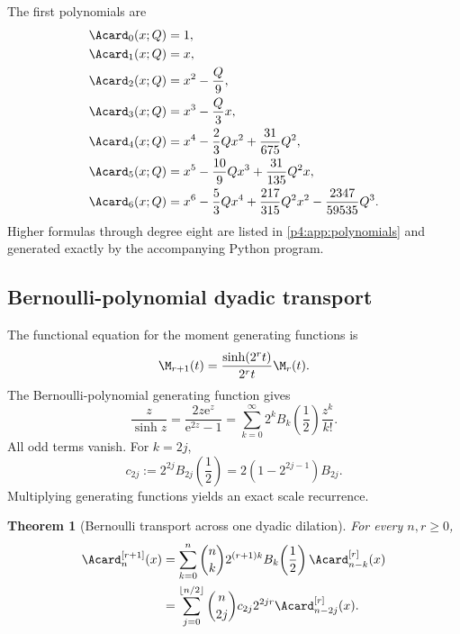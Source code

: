 \documentclass[11pt]{article}
\numberwithin{equation}{section}
\newtheorem{theorem}{Theorem}[section]
\theoremstyle{definition}
\theoremstyle{remark}
\newcommand{\e}{\mathrm e}
\begin{document}
The first polynomials are
\begin{align}
 \Acard_0(x;Q)&=1,\\
 \Acard_1(x;Q)&=x,\\
 \Acard_2(x;Q)&=x^2-\frac Q9,\\
 \Acard_3(x;Q)&=x^3-\frac Q3x,\\
 \Acard_4(x;Q)&=x^4-\frac23Qx^2+\frac{31}{675}Q^2,\\
 \Acard_5(x;Q)&=x^5-\frac{10}{9}Qx^3+\frac{31}{135}Q^2x,\\
 \Acard_6(x;Q)&=x^6-\frac53Qx^4+\frac{217}{315}Q^2x^2-\frac{2347}{59535}Q^3.
 \label{p4:eq:first-appell-polys}
\end{align}
Higher formulas through degree eight are listed in \cref{p4:app:polynomials} and generated exactly by the accompanying Python program.

\subsection{Bernoulli-polynomial dyadic transport}
The functional equation for the moment generating functions is
\begin{equation}
 \M_{r+1}(t)=\frac{\sinh(2^rt)}{2^rt}\M_r(t).
 \label{p4:eq:mgf-scale}
\end{equation}
The Bernoulli-polynomial generating function gives
\begin{equation}
 \frac z{\sinh z}
 =\frac{2z\e^z}{\e^{2z}-1}
 =\sum_{k=0}^{\infty}2^kB_k\!\left(\frac12\right)\frac{z^k}{k!}.
 \label{p4:eq:bernoulli-half}
\end{equation}
All odd terms vanish.  For $k=2j$,
\begin{equation}
 c_{2j}:=2^{2j}B_{2j}\!\left(\frac12\right)
 =2(1-2^{2j-1})B_{2j}.
 \label{p4:eq:c2j}
\end{equation}
Multiplying generating functions yields an exact scale recurrence.

\begin{theorem}[Bernoulli transport across one dyadic dilation]
\label{p4:thm:bernoulli-transport}
For every $n,r\ge0$,
\begin{align}
 \Acard_n^{[r+1]}(x)
 &=\sum_{k=0}^{n}\binom nk
  2^{(r+1)k}B_k\!\left(\frac12\right)
  \Acard_{n-k}^{[r]}(x)
 \label{p4:eq:bernoulli-transport}\\
 &=\sum_{j=0}^{\lfloor n/2\rfloor}
  \binom n{2j}c_{2j}2^{2jr}
  \Acard_{n-2j}^{[r]}(x).
 \label{p4:eq:bernoulli-transport-even}
\end{align}
\end{theorem}
\end{document}
